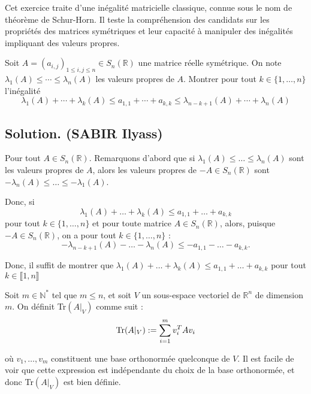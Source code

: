 Cet exercice traite d'une in{\'e}galit{\'e} matricielle classique, connue sous
le nom de th{\'e}or{\`e}me de Schur-Horn. Il teste la compr{\'e}hension des
candidats sur les propri{\'e}t{\'e}s des matrices sym{\'e}triques et leur
capacit{\'e} {\`a} manipuler des in{\'e}galit{\'e}s impliquant des valeurs
propres.

\begin{exercise}[]
Soit $A = (a_{i, j})_{1 \leqslant i, j \leqslant n} \in S_n (\mathbb{R})$ une
matrice r{\'e}elle sym{\'e}trique. On note $\lambda_1 (A) \leqslant \cdots
\leqslant \lambda_n (A)$ les valeurs propres de $A$. Montrer pour tout $k \in
\{ 1, \ldots, n \}$ l'in{\'e}galit{\'e}
\[ \lambda_1 (A) + \cdots + \lambda_k (A) \leqslant a_{1, 1} + \cdots + a_{k,
   k} \leqslant \lambda_{n - k + 1} (A) + \cdots + \lambda_n (A) \]
\end{exercise}

\subsection*{Solution. (SABIR Ilyass)}


Pour tout $A \in S_n (\mathbb{R})$. Remarquons d'abord que si $\lambda_1 (A)
\leq \ldots \leq \lambda_n (A)$ sont les valeurs propres de $A$, alors les
valeurs propres de $- A \in S_n (\mathbb{R})$ sont $- \lambda_n (A) \leq
\ldots \leq - \lambda_1 (A)$.

Donc, si
\[ \lambda_1 (A) + \ldots + \lambda_k (A) \leq a_{1, 1} + \ldots + a_{k, k}
\]
pour tout $k \in \{1, \ldots, n\}$ et pour toute matrice $A \in S_n
(\mathbb{R})$, alors, puisque $- A \in S_n (\mathbb{R})$, on a pour tout $k
\in \{1, \ldots, n\}$ :
\[ - \lambda_{n - k + 1} (A) - \ldots - \lambda_n (A) \leq - a_{1, 1} - \ldots
   - a_{k, k} . \]


Donc, il suffit de montrer que $\lambda_1 (A) + \ldots + \lambda_k (A) \leq
a_{1, 1} + \ldots + a_{k, k}$ pour tout $k \in \llbracket 1, n \rrbracket$


Soit $m \in \mathbb{N}^{\ast}$ tel que $m \leq n$, et soit $V$ un sous-espace
vectoriel de $\mathbb{R}^n$ de dimension $m$. On d{\'e}finit Tr$(A|_V)$ comme
suit :
\[ \text{Tr} (A|_V) := \sum_{i = 1}^m v_i^T Av_i \]


o{\`u} $v_1, \ldots, v_m$ constituent une base orthonorm{\'e}e quelconque de
$V$. Il est facile de voir que cette expression est ind{\'e}pendante du choix
de la base orthonorm{\'e}e, et donc Tr$(A|_V)$ est bien d{\'e}finie.

